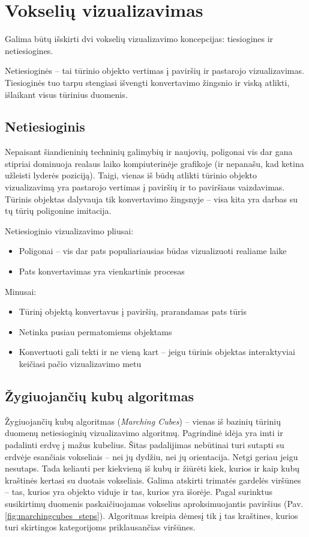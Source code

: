\section{Vokselių vizualizavimas}

Galima būtų išskirti dvi vokselių vizualizavimo koncepcijas: tiesiogines ir
netiesiogines.

Netiesioginės – tai tūrinio objekto vertimas į paviršių ir pastarojo
vizualizavimas. Tiesioginės tuo tarpu stengiasi išvengti konvertavimo žingsnio
ir viską atlikti, išlaikant visus tūrinius duomenis.

\subsection{Netiesioginis}

Nepaisant šiandieninių techninių galimybių ir naujovių, poligonai vis dar
gana stipriai dominuoja realaus laiko kompiuterinėje grafikoje (ir
nepanašu, kad ketina užleisti lyderės poziciją). Taigi, vienas iš būdų
atlikti tūrinio objekto vizualizavimą yra pastarojo vertimas į paviršių
ir to paviršiaus vaizdavimas. Tūrinis objektas dalyvauja tik
konvertavimo žingsnyje -- visa kita yra darbas su tų tūrių poligonine
imitacija.

Netiesioginio vizualizavimo pliusai:
\begin{itemize}
\item Poligonai -- vis dar pats populiariausias būdas vizualizuoti realiame laike
\item Pats konvertavimas yra vienkartinis procesas
\end{itemize}

Minusai:
\begin{itemize}
\item Tūrinį objektą konvertavus į paviršių, prarandamas pats tūris
\item Netinka pusiau permatomiems objektams
\item
  Konvertuoti gali tekti ir ne vieną kart -- jeigu tūrinis objektas
  interaktyviai keičiasi pačio vizualizavimo metu
\end{itemize}

\subsection{Žygiuojančių kubų algoritmas}

Žygiuojančių kubų algoritmas (\emph{Marching Cubes}) \cite{bib:marching-cubes}
-- vienas iš bazinių tūrinių duomenų netiesioginių vizualizavimo algoritmų.
Pagrindinė idėja yra imti ir padalinti erdvę į mažus kubelius. Šitas
padalijimas nebūtinai turi sutapti su erdvėje esančiais vokseliais – nei jų
dydžiu, nei jų orientacija. Netgi geriau jeigu nesutaps. Tada keliauti per
kiekvieną iš kubų ir žiūrėti kiek, kurios ir kaip kubų kraštinės kertasi su
duotais vokseliais. Galima atskirti trimatės gardelės viršūnes -- tas, kurios
yra objekto viduje ir tas, kurios yra išorėje. Pagal surinktus susikirtimų
duomenis paskaičiuojamas vokselius aproksimuojantis paviršius (Pav.
\ref{fig:marchingcubes_steps}). Algoritmas kreipia dėmesį tik į tas kraštines,
kurios turi skirtingos kategorijoms priklausančias viršūnes.


